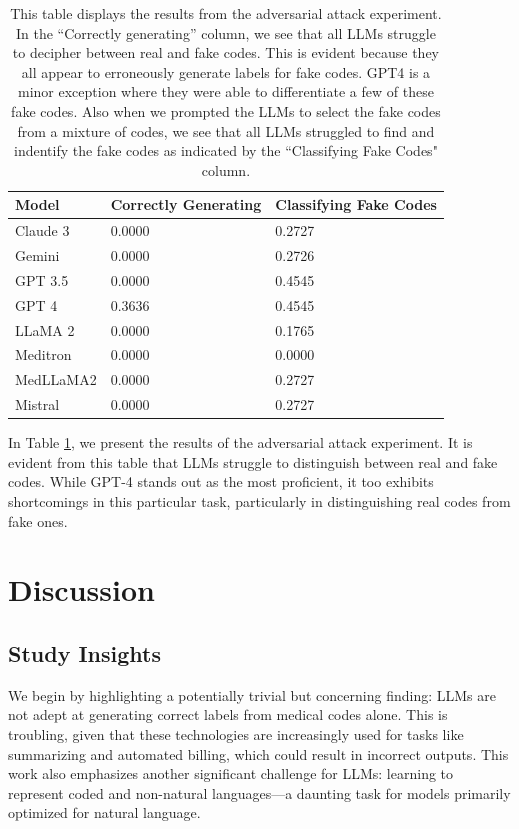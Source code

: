 \documentclass[11pt]{article}
\theoremstyle{plain}
\theoremstyle{definition}
\theoremstyle{remark}
\begin{document}
\begin{table}[h!]
  \centering 
  \caption{This table displays the results from the adversarial attack experiment. In the ``Correctly generating'' column, we see that all LLMs struggle to decipher between real and fake codes. This is evident because they all appear to erroneously generate labels for fake codes. GPT4 is a minor exception where they were able to differentiate a few of these fake codes. Also when we prompted the LLMs to select the fake codes from a mixture of codes, we see that all LLMs struggled to find and indentify the fake codes as indicated by the ``Classifying Fake Codes" column.}
  \begin{adjustbox}{width=\columnwidth}
  \begin{tabular}{lll}
  \toprule
    \textbf{Model} & \textbf{Correctly Generating} & \textbf{Classifying Fake Codes}\\
    \midrule
    Claude 3 & 0.0000 & 0.2727 \\ 
    Gemini & 0.0000 & 0.2726 \\ 
    GPT 3.5 & 0.0000 & 0.4545 \\ 
    GPT 4 & 0.3636 & 0.4545 \\ 
    LLaMA 2 & 0.0000 & 0.1765 \\ 
    Meditron & 0.0000 & 0.0000 \\ 
    MedLLaMA2 & 0.0000 & 0.2727 \\ 
    Mistral & 0.0000 & 0.2727 \\ 
  \bottomrule
  \end{tabular}
  \end{adjustbox}
  \label{tab4}
\end{table}

In Table \ref{tab4}, we present the results of the adversarial attack experiment. It is evident from this table that LLMs struggle to distinguish between real and fake codes. While GPT-4 stands out as the most proficient, it too exhibits shortcomings in this particular task, particularly in distinguishing real codes from fake ones.


\section{Discussion}
\subsection{Study Insights}

We begin by highlighting a potentially trivial but concerning finding: LLMs are not adept at generating correct labels from medical codes alone. This is troubling, given that these technologies are increasingly used for tasks like summarizing and automated billing, which could result in incorrect outputs. This work also emphasizes another significant challenge for LLMs: learning to represent coded and non-natural languages—a daunting task for models primarily optimized for natural language.
\end{document}
